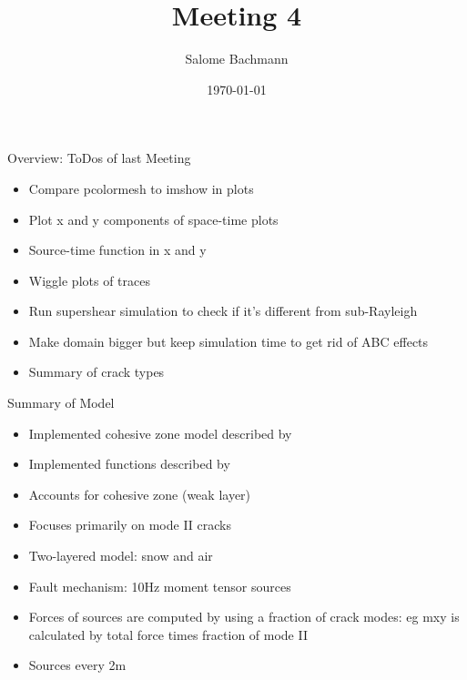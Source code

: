 \documentclass[11pt,aspectratio=169]{beamer}
\title{Meeting 4}
\date[]{\today}
\author{Salome Bachmann}
\institute{}
\begin{document}

\titleframe





\begin{frame}{Overview: ToDos of last Meeting}
    \begin{itemize}
        \item Compare pcolormesh to imshow in plots
        \item Plot x and y components of space-time plots
        \item Source-time function in x and y 
        \item Wiggle plots of traces
        \item Run supershear simulation to check if it's different from sub-Rayleigh
        \item Make domain bigger but keep simulation time to get rid of ABC effects
        \item Summary of crack types
    \end{itemize}
\end{frame}


\begin{frame}{Summary of Model}
    \begin{itemize}
        \item Implemented cohesive zone model described by \cite{mahajanModelingInterfacialCrack2008}
        \item Implemented functions described by \cite{mahajanModelingInterfacialCrack2008}
        \item Accounts for cohesive zone (weak layer)
        \item Focuses primarily on mode II cracks 
        \item Two-layered model: snow and air
        \item Fault mechanism: 10Hz moment tensor sources
        \item Forces of sources are computed by using a fraction of crack modes: eg mxy is calculated by total force times fraction of mode II
        \item Sources every 2m 
    \end{itemize}
\end{frame}
\end{document}
